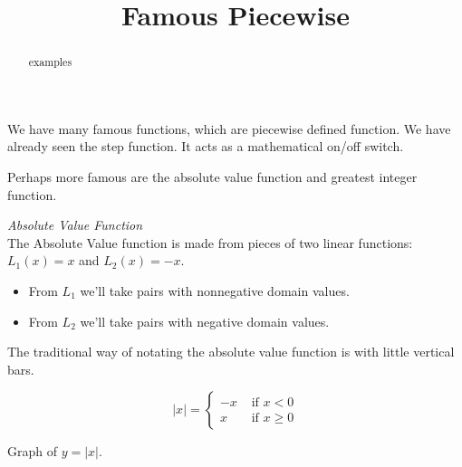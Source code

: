\documentclass{ximera}
\title{Famous Piecewise}
\begin{document}
\begin{abstract}
examples
\end{abstract}
\maketitle



We have many famous functions, which are piecewise defined function.  We have already seen the step function.  It acts as a mathematical on/off switch.

Perhaps more famous are the absolute value function and greatest integer function.







\begin{example} \textit{Absolute Value Function} \\

The Absolute Value function is made from pieces of two linear functions: $L_1(x) = x$ and $L_2(x) = -x$. 

\begin{itemize}
\item From $L_1$ we'll take pairs with nonnegative domain values.
\item From $L_2$ we'll take pairs with negative domain values.
\end{itemize}

The traditional way of notating the absolute value function is with little vertical bars.


\[
|x| = 
\begin{cases}
  -x & \text{ if }  x < 0 \\
  x & \text{ if } x \geq 0
\end{cases}
\]



Graph of $y = |x|$.
\begin{image}
\end{image}


\end{example}
\end{document}
